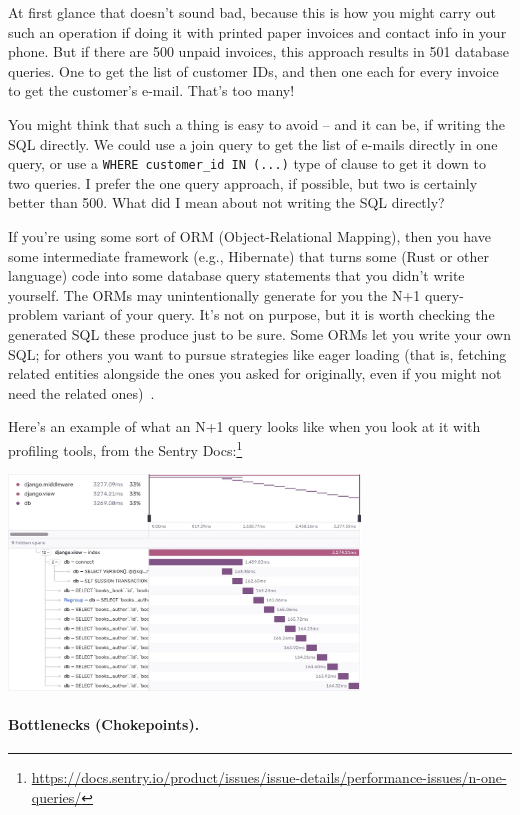 At first glance that doesn't sound bad, because this is how you might carry out such an operation if doing it with printed paper invoices and contact info in your phone. But if there are 500 unpaid invoices, this approach results in 501 database queries. One to get the list of customer IDs, and then one each for every invoice to get the customer's e-mail. That's too many! 

You might think that such a thing is easy to avoid -- and it can be, if writing the SQL directly. We could use a join query to get the list of e-mails directly in one query, or use a \texttt{WHERE customer\_id IN (...)} type of clause to get it down to two queries. I prefer the one query approach, if possible, but two is certainly better than 500. What did I mean about not writing the SQL directly?

If you're using some sort of ORM (Object-Relational Mapping), then you have some intermediate framework (e.g., Hibernate) that turns some (Rust or other language) code into some database query statements that you didn't write yourself. The ORMs may unintentionally generate for you the N+1 query-problem variant of your query. It's not on purpose, but it is worth checking the generated SQL these produce just to be sure. Some ORMs let you write your own SQL; for others you want to pursue strategies like eager loading (that is, fetching related entities alongside the ones you asked for originally, even if you might not need the related ones)~\cite{nplusone}. 

Here's an example of what an N+1 query looks like when you look at it with profiling tools, from the Sentry Docs:\footnote{\url{https://docs.sentry.io/product/issues/issue-details/performance-issues/n-one-queries/}}
\begin{center}
  \includegraphics[width=0.7\textwidth]{images/nplusone.png}
\end{center}

\paragraph{Bottlenecks (Chokepoints).} 

